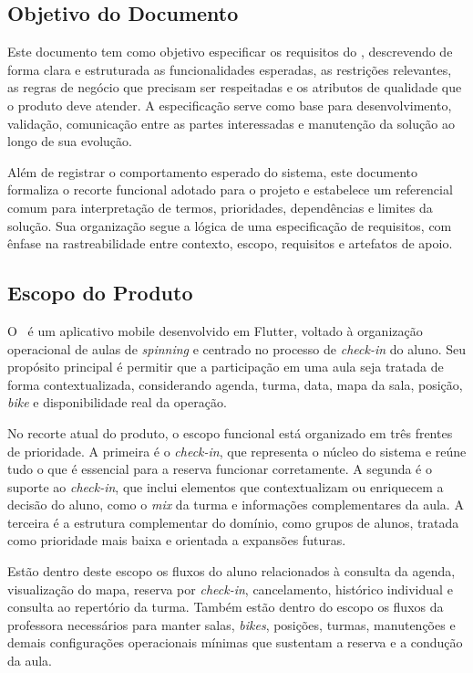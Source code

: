 \subsection{Objetivo do Documento}

Este documento tem como objetivo especificar os requisitos do \ProjetoNome, descrevendo de forma clara e estruturada as funcionalidades esperadas, as restrições relevantes, as regras de negócio que precisam ser respeitadas e os atributos de qualidade que o produto deve atender. A especificação serve como base para desenvolvimento, validação, comunicação entre as partes interessadas e manutenção da solução ao longo de sua evolução.

Além de registrar o comportamento esperado do sistema, este documento formaliza o recorte funcional adotado para o projeto e estabelece um referencial comum para interpretação de termos, prioridades, dependências e limites da solução. Sua organização segue a lógica de uma especificação de requisitos, com ênfase na rastreabilidade entre contexto, escopo, requisitos e artefatos de apoio.

\subsection{Escopo do Produto}

O \ProjetoNome\ é um aplicativo mobile desenvolvido em Flutter, voltado à organização operacional de aulas de \textit{spinning} e centrado no processo de \textit{check-in} do aluno. Seu propósito principal é permitir que a participação em uma aula seja tratada de forma contextualizada, considerando agenda, turma, data, mapa da sala, posição, \textit{bike} e disponibilidade real da operação.

No recorte atual do produto, o escopo funcional está organizado em três frentes de prioridade. A primeira é o \textit{check-in}, que representa o núcleo do sistema e reúne tudo o que é essencial para a reserva funcionar corretamente. A segunda é o suporte ao \textit{check-in}, que inclui elementos que contextualizam ou enriquecem a decisão do aluno, como o \textit{mix} da turma e informações complementares da aula. A terceira é a estrutura complementar do domínio, como grupos de alunos, tratada como prioridade mais baixa e orientada a expansões futuras.

Estão dentro deste escopo os fluxos do aluno relacionados à consulta da agenda, visualização do mapa, reserva por \textit{check-in}, cancelamento, histórico individual e consulta ao repertório da turma. Também estão dentro do escopo os fluxos da professora necessários para manter salas, \textit{bikes}, posições, turmas, manutenções e demais configurações operacionais mínimas que sustentam a reserva e a condução da aula.

